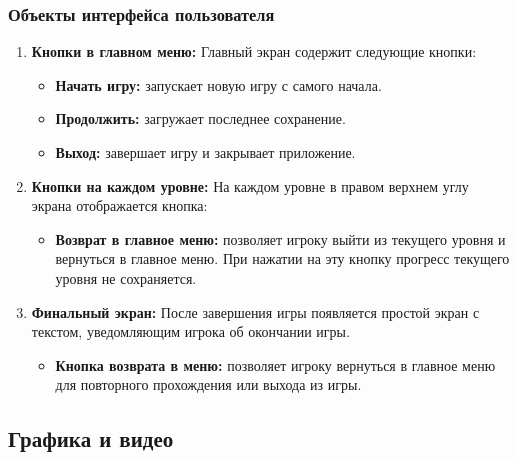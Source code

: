 \documentclass{article}
\begin{document}
\subsubsection{Объекты интерфейса пользователя}
    \begin{enumerate}
    \item \textbf{Кнопки в главном меню:}  
    Главный экран содержит следующие кнопки:  
    \begin{itemize}
        \item \textbf{Начать игру:} запускает новую игру с самого начала.  
        \item \textbf{Продолжить:} загружает последнее сохранение.  
        \item \textbf{Выход:} завершает игру и закрывает приложение.  
    \end{itemize}

    \item \textbf{Кнопки на каждом уровне:}  
    На каждом уровне в правом верхнем углу экрана отображается кнопка:  
    \begin{itemize}
        \item \textbf{Возврат в главное меню:} позволяет игроку выйти из текущего уровня и вернуться в главное меню. При нажатии на эту кнопку прогресс текущего уровня не сохраняется.  
    \end{itemize}

    \item \textbf{Финальный экран:}  
    После завершения игры появляется простой экран с текстом, уведомляющим игрока об окончании игры.  
    \begin{itemize}
        \item \textbf{Кнопка возврата в меню:} позволяет игроку вернуться в главное меню для повторного прохождения или выхода из игры.  
    \end{itemize}
    \end{enumerate}
\subsection{Графика и видео}
\end{document}
